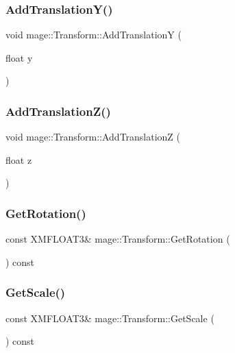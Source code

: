 \subsubsection{\texorpdfstring{Add\+Translation\+Y()}{AddTranslationY()}}
{\footnotesize\ttfamily void mage\+::\+Transform\+::\+Add\+TranslationY (\begin{DoxyParamCaption}\item[{float}]{y }\end{DoxyParamCaption})}

\hypertarget{structmage_1_1_transform_a0553f72a6fcf38128d2201d54584f079}{}\label{structmage_1_1_transform_a0553f72a6fcf38128d2201d54584f079} 
\subsubsection{\texorpdfstring{Add\+Translation\+Z()}{AddTranslationZ()}}
{\footnotesize\ttfamily void mage\+::\+Transform\+::\+Add\+TranslationZ (\begin{DoxyParamCaption}\item[{float}]{z }\end{DoxyParamCaption})}

\hypertarget{structmage_1_1_transform_af049c07a3687a66f0359bd287f2a497d}{}\label{structmage_1_1_transform_af049c07a3687a66f0359bd287f2a497d} 
\subsubsection{\texorpdfstring{Get\+Rotation()}{GetRotation()}}
{\footnotesize\ttfamily const X\+M\+F\+L\+O\+A\+T3\& mage\+::\+Transform\+::\+Get\+Rotation (\begin{DoxyParamCaption}{ }\end{DoxyParamCaption}) const}

\hypertarget{structmage_1_1_transform_a6b2e52c03574ba7e1cd46cd8b8a3770c}{}\label{structmage_1_1_transform_a6b2e52c03574ba7e1cd46cd8b8a3770c} 
\subsubsection{\texorpdfstring{Get\+Scale()}{GetScale()}}
{\footnotesize\ttfamily const X\+M\+F\+L\+O\+A\+T3\& mage\+::\+Transform\+::\+Get\+Scale (\begin{DoxyParamCaption}{ }\end{DoxyParamCaption}) const}

